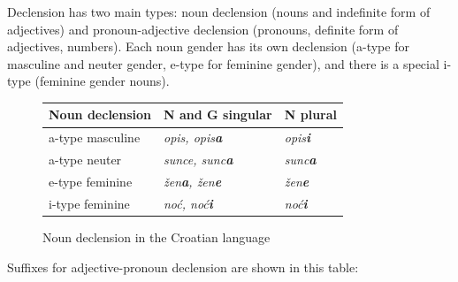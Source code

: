 \begin{multicols}{2}
Declension has two main types: noun declension (nouns and indefinite form of adjectives) and pronoun-adjective declension (pronouns, definite form of adjectives, numbers). Each noun gender has its own declension (a-type for masculine and neuter gender, e-type for feminine gender), and there is a special i-type (feminine gender nouns).

\begin{figure}[htb]
\centering
	\begin{tabular}{|l|l|l|}
  \hline
  \textbf{Noun declension} & \textbf{N and G singular} & \textbf{N plural} \\ 
  \hline \hline
  a-type masculine    & \emph{opis, opis\textbf{a}}     &  \emph{opis\textbf{i}} \\ 
  \hline
  a-type neuter   & \emph{sunce, sunc\textbf{a}}     &  \emph{sunc\textbf{a}} \\ 
  \hline
  e-type feminine   & \emph{žen\textbf{a}, žen\textbf{e}}     &  \emph{žen\textbf{e}} \\
  \hline
  i-type feminine   & \emph{noć, noć\textbf{i}}     &  \emph{noć\textbf{i}} \\
  \hline
  \end{tabular}
  \caption{Noun declension in the Croatian language}
  \label{fig:imenicka_en}
\end{figure}

Suffixes for adjective-pronoun declension are shown in this table:


\end{multicols}
